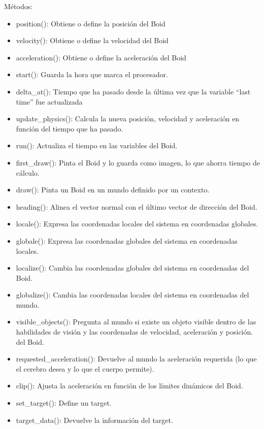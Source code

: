 Métodos:
\begin{itemize}
 \item position():
Obtiene o define la posición del Boid

  \item velocity():
Obtiene o define la velocidad del Boid

  \item acceleration():
Obtiene o define la aceleración del Boid

  \item start():
Guarda la hora que marca el procesador.

  \item delta\_at():
Tiempo que ha pasado desde la última vez que la variable “last time” fue actualizada

  \item update\_physics():
Calcula la nueva posición, velocidad y aceleración en función del tiempo que ha pasado.

  \item run():
Actualiza el tiempo en las variables del Boid.

  \item first\_draw():
Pinta el Boid y lo guarda como imagen, lo que ahorra tiempo de cálculo.

  \item draw():
Pinta un Boid en un mundo definido por un contexto.

  \item heading():
Alinea el vector normal con el último vector de dirección del Boid.

  \item locale():
Expresa las coordenadas locales del sistema en coordenadas globales.

  \item globale():
Expresa las coordenadas globales del sistema en coordenadas locales.

  \item localize():
Cambia las coordenadas globales del sistema en coordenadas del Boid.

  \item globalize():
Cambia las coordenadas locales del sistema en coordenadas del mundo.

  \item visible\_objects():  
Pregunta al mundo si existe un objeto visible dentro de las habilidades de visión y las coordenadas de velocidad, aceleración y posición.
del Boid.

  \item requested\_acceleration(): Devuelve al mundo la aceleración requerida (lo que el cerebro desea y lo que el cuerpo permite).

  \item clip():
Ajusta la aceleración en función de los límites dinámicos del Boid.

  \item set\_target():
Define un target.

  \item  target\_data():
Devuelve la información del target.
\end{itemize}

